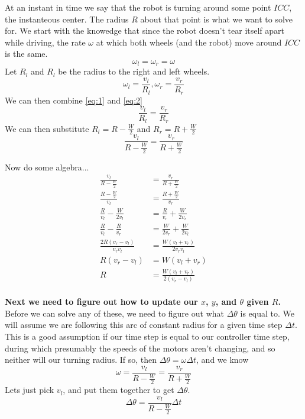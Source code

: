 \documentclass{article}
\begin{document}
At an instant in time we say that the robot is turning around some point $ICC$, the instanteous center. The radius $R$ about that point is what we want to solve for. We start with the knowedge that since the robot doesn't tear itself apart while driving, the rate $\omega$ at which both wheels (and the robot) move around $ICC$ is the same.
\begin{equation} \label{eq:1}
  \omega_l = \omega_r = \omega
\end{equation}
Let $R_l$ and $R_l$ be the radius to the right and left wheels.
\begin{equation} \label{eq:2}
  \omega_l = \frac{v_l}{R_l}, \omega_r = \frac{v_r}{R_r}
\end{equation}
We can then combine \ref{eq:1} and \ref{eq:2}
\begin{equation}
  \frac{v_l}{R_l} = \frac{v_r}{R_r}
\end{equation}
We can then substitute $R_l = R - \frac{W}{2}$ and $R_r = R + \frac{W}{2}$
\begin{equation}
  \frac{v_l}{R-\frac{W}{2}} = \frac{v_r}{R + \frac{W}{2}}
\end{equation}

Now do some algebra...
\begin{align*}
  \frac{v_l}{R-\frac{W}{2}} &= \frac{v_r}{R + \frac{W}{2}} \\[1em]
  \frac{R-\frac{W}{2}}{v_l} &= \frac{R + \frac{W}{2}}{v_r} \\[1em]
  \frac{R}{v_l}-\frac{W}{2v_l} &= \frac{R}{v_r} + \frac{W}{2v_r} \\[1em]
  \frac{R}{v_l}-\frac{R}{v_r} &= \frac{W}{2v_r}+\frac{W}{2v_l} \\[1em]
  \frac{2R(v_r-v_l)}{v_rv_l} &= \frac{W(v_l+v_r)}{2v_rv_l} \\[1em]
  R(v_r-v_l) &= W(v_l+v_r) \\[1em]
  R &= \frac{W(v_l+v_r)}{2(v_r-v_l)} \\[1em]
\end{align*}

\textbf{Next we need to figure out how to update our $x$, $y$, and $\theta$ given $R$.} \\

Before we can solve any of these, we need to figure out what $\Delta\theta$ is equal to. We will assume we are following this arc of constant radius for a given time step $\Delta t$. This is a good assumption if our time step is equal to our controller time step, during which presumably the speeds of the motors aren't changing, and so neither will our turning radius. If so, then $\Delta\theta = \omega\Delta t$, and we know
$$\omega=\dfrac{v_l}{R-\frac{W}{2}} = \dfrac{v_r}{R+\frac{W}{2}}$$
Lets just pick $v_l$, and put them together to get $\Delta\theta$.
$$\Delta\theta = \dfrac{v_l}{R-\frac{W}{2}}\Delta t$$
\end{document}
